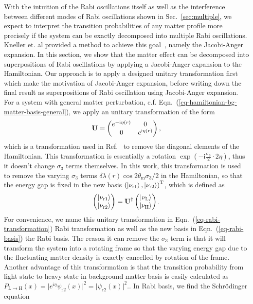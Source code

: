 With the intuition of the Rabi oscillations itself as well as the interference between different modes of Rabi oscillations shown in Sec.~\ref{sec:multiple}, we expect to interpret the transition probabilities of any matter profile more precisely if the system can be exactly decomposed into multiple Rabi oscillations. Kneller et. al provided a method to achieve this goal~\cite{Kneller2013}, namely the Jacobi-Anger expansion. In this section, we show that the matter effect can be decomposed into superpositions of Rabi oscillations by applying a Jacobi-Anger expansion to the Hamiltonian. Our approach is to apply a designed unitary transformation first which make the motivation of Jacobi-Anger expansion, before writing down the final result as superpositions of Rabi oscillation using Jacobi-Anger expansion. For a system with general matter perturbation, c.f. Eqn.~(\ref{eq-hamiltonian-bg-matter-basis-general}), we apply an unitary transformation of the form
\begin{equation}
    \mathbf{U} =  \begin{pmatrix} e^{-\ri \eta (r)} & 0 \\  0 & e^{\mathrm i \eta (r)}  \end{pmatrix},
    \label{eq-rabi-transformation}
\end{equation}
which is a transformation used in Ref.~\cite{Kneller2006} to remove the diagonal elements of the Hamiltonian. This transformation is essentially a rotation $\exp\left(-\mathrm i\frac{\sigma_3}{2}\cdot 2\eta\right)$, thus it doesn't change $
\sigma_3$ terms themselves. In this work, this transformation is used to remove the varying $\sigma_3$ terms $\delta\lambda(r) \cos 2\theta_{\mathrm m} \sigma_3/2$ in the Hamiltonian, so that the energy gap is fixed in the new basis $\left(\left| \nu_{\mathrm{r1}}\right\rangle,\left| \nu_{\mathrm{r2}}\right\rangle\right)^{\mathrm{T}}$, which is defined as
\begin{equation}
    \begin{pmatrix} \ket{\nu_{\mathrm{r1}}}\\ \ket{\nu_{\mathrm{r2}}} \end{pmatrix} =  \mathbf{U}^\dagger \begin{pmatrix} \ket{\nu_{\mathrm{L}}} \\ \ket{\nu_{\mathrm{H}}} \end{pmatrix}.
    \label{eq-rabi-basis}
\end{equation}
For convenience, we name this unitary transformation in Eqn.~(\ref{eq-rabi-transformation}) Rabi transformation as well as the new basis in Eqn.~(\ref{eq-rabi-basis}) the Rabi basis. The reason it can remove the $\sigma_3$ term is that it will transform the system into a rotating frame so that the varying energy gap due to the fluctuating matter density is exactly cancelled by rotation of the frame. Another advantage of this transformation is that the transition probability from light state to heavy state in background matter basis is easily calculated as $P_{\mathrm{L} \to 
\mathrm{H}} (x) = \lvert e^{i\eta} \psi_{\mathrm r2} (x)  \rvert^2 = \lvert \psi_{\mathrm r2} (x)  \rvert^2 .$. In Rabi basis, we find the Schr\"{o}dinger equation
